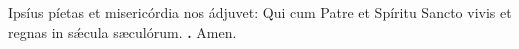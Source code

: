  \hspace{.3em}
Ipsíus píetas et misericórdia nos ádjuvet: Qui cum Patre et Spíritu Sancto vivis et regnas in s\'{\ae}cula sæculórum. 
\textbf{\Rbar.} Amen.




